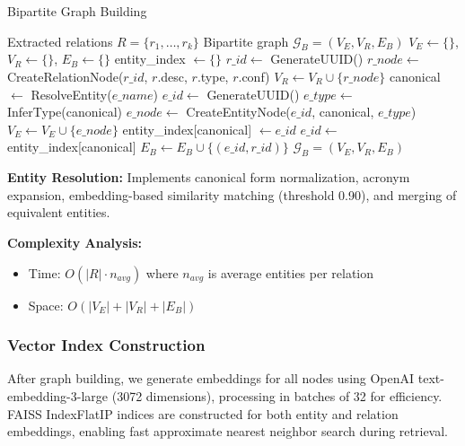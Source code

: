 \documentclass[11pt,a4paper]{article}
\begin{document}
\begin{algorithm}
\caption{Bipartite Graph Building}
\begin{algorithmic}[1]
\REQUIRE Extracted relations $R = \{r_1, \ldots, r_k\}$
\ENSURE Bipartite graph $\mathcal{G}_B = (V_E, V_R, E_B)$
\STATE $V_E \leftarrow \{\}$, $V_R \leftarrow \{\}$, $E_B \leftarrow \{\}$
\STATE entity\_index $\leftarrow \{\}$ 
    \STATE $r\_id \leftarrow$ GenerateUUID()
    \STATE $r\_node \leftarrow$ CreateRelationNode($r\_id$, $r$.desc, $r$.type, $r$.conf)
    \STATE $V_R \leftarrow V_R \cup \{r\_node\}$
        \STATE canonical $\leftarrow$ ResolveEntity($e\_name$) 
            \STATE $e\_id \leftarrow$ GenerateUUID()
            \STATE $e\_type \leftarrow$ InferType(canonical)
            \STATE $e\_node \leftarrow$ CreateEntityNode($e\_id$, canonical, $e\_type$)
            \STATE $V_E \leftarrow V_E \cup \{e\_node\}$
            \STATE entity\_index[canonical] $\leftarrow e\_id$
        \ELSE
            \STATE $e\_id \leftarrow$ entity\_index[canonical]
        \ENDIF
        \STATE $E_B \leftarrow E_B \cup \{(e\_id, r\_id)\}$ 
    \ENDFOR
\ENDFOR
\RETURN $\mathcal{G}_B = (V_E, V_R, E_B)$
\end{algorithmic}
\end{algorithm}

\textbf{Entity Resolution:} Implements canonical form normalization, acronym expansion, embedding-based similarity matching (threshold 0.90), and merging of equivalent entities.

\textbf{Complexity Analysis:}
\begin{itemize}
    \item Time: $O(|R| \cdot n_{avg})$ where $n_{avg}$ is average entities per relation
    \item Space: $O(|V_E| + |V_R| + |E_B|)$
\end{itemize}

\subsubsection{Vector Index Construction}

After graph building, we generate embeddings for all nodes using OpenAI text-embedding-3-large (3072 dimensions), processing in batches of 32 for efficiency. FAISS IndexFlatIP indices are constructed for both entity and relation embeddings, enabling fast approximate nearest neighbor search during retrieval.
\end{document}
